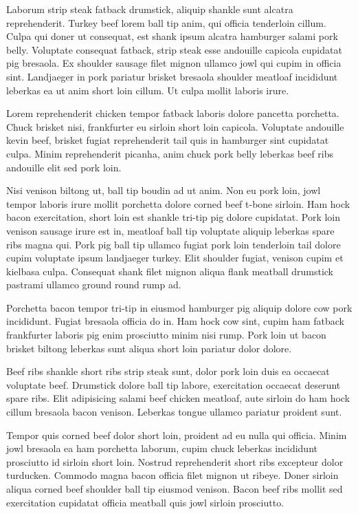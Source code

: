 Laborum strip steak fatback drumstick, aliquip shankle sunt alcatra reprehenderit. Turkey beef lorem ball tip anim, qui officia tenderloin cillum. Culpa qui doner ut consequat, est shank ipsum alcatra hamburger salami pork belly. Voluptate consequat fatback, strip steak esse andouille capicola cupidatat pig bresaola. Ex shoulder sausage filet mignon ullamco jowl qui cupim in officia sint. Landjaeger in pork pariatur brisket bresaola shoulder meatloaf incididunt leberkas ea ut anim short loin cillum. Ut culpa mollit laboris irure.

Lorem reprehenderit chicken tempor fatback laboris dolore pancetta porchetta. Chuck brisket nisi, frankfurter eu sirloin short loin capicola. Voluptate andouille kevin beef, brisket fugiat reprehenderit tail quis in hamburger sint cupidatat culpa. Minim reprehenderit picanha, anim chuck pork belly leberkas beef ribs andouille elit sed pork loin.

Nisi venison biltong ut, ball tip boudin ad ut anim. Non eu pork loin, jowl tempor laboris irure mollit porchetta dolore corned beef t-bone sirloin. Ham hock bacon exercitation, short loin est shankle tri-tip pig dolore cupidatat. Pork loin venison sausage irure est in, meatloaf ball tip voluptate aliquip leberkas spare ribs magna qui. Pork pig ball tip ullamco fugiat pork loin tenderloin tail dolore cupim voluptate ipsum landjaeger turkey. Elit shoulder fugiat, venison cupim et kielbasa culpa. Consequat shank filet mignon aliqua flank meatball drumstick pastrami ullamco ground round rump ad.

Porchetta bacon tempor tri-tip in eiusmod hamburger pig aliquip dolore cow pork incididunt. Fugiat bresaola officia do in. Ham hock cow sint, cupim ham fatback frankfurter laboris pig enim prosciutto minim nisi rump. Pork loin ut bacon brisket biltong leberkas sunt aliqua short loin pariatur dolor dolore.

Beef ribs shankle short ribs strip steak sunt, dolor pork loin duis ea occaecat voluptate beef. Drumstick dolore ball tip labore, exercitation occaecat deserunt spare ribs. Elit adipisicing salami beef chicken meatloaf, aute sirloin do ham hock cillum bresaola bacon venison. Leberkas tongue ullamco pariatur proident sunt.

Tempor quis corned beef dolor short loin, proident ad eu nulla qui officia. Minim jowl bresaola ea ham porchetta laborum, cupim chuck leberkas incididunt prosciutto id sirloin short loin. Nostrud reprehenderit short ribs excepteur dolor turducken. Commodo magna bacon officia filet mignon ut ribeye. Doner sirloin aliqua corned beef shoulder ball tip eiusmod venison. Bacon beef ribs mollit sed exercitation cupidatat officia meatball quis jowl sirloin prosciutto.

